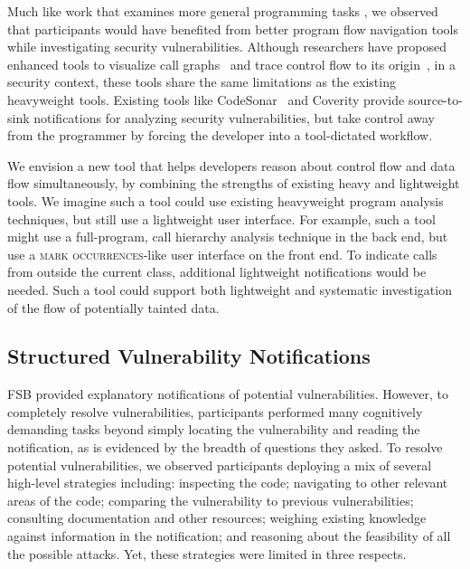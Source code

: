 \documentclass[10pt,journal,compsoc]{IEEEtran}
\begin{document}
Much like work that examines more general programming tasks \cite{latoza2010hard}, we observed that participants would have benefited from better program flow navigation tools while investigating security vulnerabilities.
Although researchers have proposed enhanced tools to visualize call graphs~\cite{latoza2011visualizing} and trace control flow to its origin~\cite{barnett2014getMeHere},
in a security context, these tools share the same limitations as the existing heavyweight tools.
Existing tools like CodeSonar~\cite{CodeSonar} and Coverity provide source-to-sink notifications for analyzing security
vulnerabilities, but take control away from the programmer by forcing the developer into a tool-dictated
workflow.


We envision a new tool that helps developers reason about control flow and data flow simultaneously,
by combining the strengths of existing heavy and lightweight tools.
We imagine such a tool could use existing heavyweight program analysis techniques, but still
use a lightweight user interface.
For example, such a tool might use a full-program, call hierarchy analysis technique in the back end,
but use a \textsc{mark occurrences}-like user interface on the front end.
To indicate calls from outside the current class, additional lightweight notifications would be needed.
Such a tool could support both lightweight and systematic investigation of the flow of 
potentially tainted data.




\subsection{Structured Vulnerability Notifications}
\label{structuredNotifications}
FSB provided explanatory notifications of potential vulnerabilities.
However, to completely resolve vulnerabilities,
participants performed many cognitively demanding tasks beyond simply locating the vulnerability and reading the notification, 
as is evidenced by the breadth of questions they asked. 
To resolve potential vulnerabilities, we observed participants deploying a mix of several high-level strategies including: 
inspecting the code;
navigating to other relevant areas of the code; 
comparing the vulnerability to previous vulnerabilities; 
consulting documentation and other resources; 
weighing existing knowledge against information in the notification; 
and reasoning about the feasibility of all the possible attacks. 
Yet, these strategies were limited in three respects.
\end{document}
